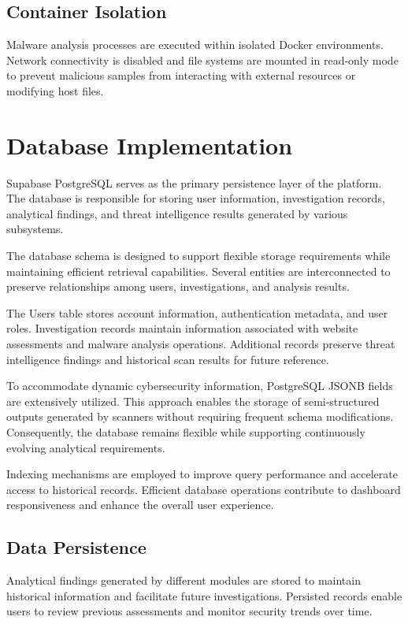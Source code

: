\subsection{Container Isolation}
Malware analysis processes are executed within isolated Docker environments. Network connectivity is disabled and file systems are mounted in read-only mode to prevent malicious samples from interacting with external resources or modifying host files.

\section{Database Implementation}
Supabase PostgreSQL serves as the primary persistence layer of the platform. The database is responsible for storing user information, investigation records, analytical findings, and threat intelligence results generated by various subsystems.

The database schema is designed to support flexible storage requirements while maintaining efficient retrieval capabilities. Several entities are interconnected to preserve relationships among users, investigations, and analysis results.

The Users table stores account information, authentication metadata, and user roles. Investigation records maintain information associated with website assessments and malware analysis operations. Additional records preserve threat intelligence findings and historical scan results for future reference.

To accommodate dynamic cybersecurity information, PostgreSQL JSONB fields are extensively utilized. This approach enables the storage of semi-structured outputs generated by scanners without requiring frequent schema modifications. Consequently, the database remains flexible while supporting continuously evolving analytical requirements.

Indexing mechanisms are employed to improve query performance and accelerate access to historical records. Efficient database operations contribute to dashboard responsiveness and enhance the overall user experience.

\subsection{Data Persistence}
Analytical findings generated by different modules are stored to maintain historical information and facilitate future investigations. Persisted records enable users to review previous assessments and monitor security trends over time.

